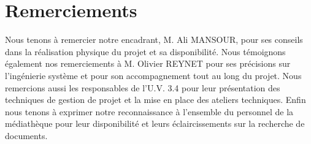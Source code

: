 \section*{Remerciements}

Nous tenons à remercier notre encadrant, M. Ali MANSOUR, pour ses conseils dans la réalisation physique du projet et sa disponibilité.
\bigbreak
Nous témoignons également nos remerciements à M. Olivier REYNET pour ses précisions sur l’ingénierie système et pour son accompagnement tout au long du projet.
\bigbreak
Nous remercions aussi les responsables de l’U.V. 3.4 pour leur présentation des techniques de gestion de projet et la mise en place des ateliers techniques.
\bigbreak
Enfin nous tenons à exprimer notre reconnaissance à l’ensemble du personnel de la médiathèque pour leur disponibilité et leurs éclaircissements sur la recherche de documents.